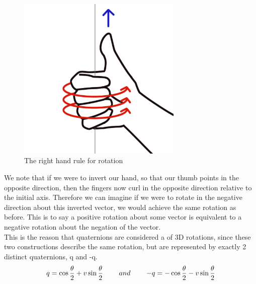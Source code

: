 \begin{figure}[h]
    \centering
    \includegraphics[width=0.7\textwidth]{figures/right-hand-rule.png}
    \caption{The right hand rule for rotation}
    \label{fig:right-hand-rule}
\end{figure}

We note that if we were to invert our hand, so that our thumb points in the opposite direction, then the fingers now curl in the opposite direction relative to the initial axis. Therefore we can imagine if we were to rotate in the negative direction about this inverted vector, we would achieve the same rotation as before. This is to say a positive rotation about some vector is equivalent to a negative rotation about the negation of the vector.\\

This is the reason that quaternions are considered a  of 3D rotations, since these two constructions describe the same rotation, but are represented by exactly 2 distinct quaternions, q and -q.
$$ q = \cos{\frac{\theta}{2}} + v\sin{\frac{\theta}{2}} \operatorname{\operatorname{\: \: \: \:} \operatorname{\: \: \: \:}} and \operatorname{\operatorname{\: \: \: \:} \operatorname{\: \: \: \:}} -q = -\cos{\frac{\theta}{2}} - v\sin{\frac{\theta}{2}}$$






